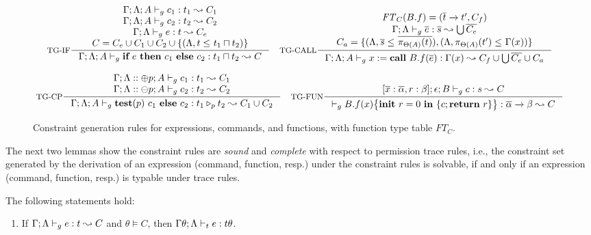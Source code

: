 {{{\begin{figure*}[ht]
\begin{tiny}
\[
\inference[TG-IF]
{
\Gamma;\trace; A \vdash_{g} c_1 : t_1 \leadsto C_1 \\
\Gamma;\trace; A \vdash_{g} c_2 : t_2 \leadsto C_2 \\
\Gamma;\trace \vdash_{g} e : t \leadsto C_e \\
C = C_e\cup C_1\cup C_2 \cup \{(\trace, t \leq_{} t_1\sqcap t_2) \}}
{\Gamma;\trace;  A \vdash_{g} \lcIF{e}{c_1}{c_2} : t_1\sqcap t_2 \leadsto C}
\quad
\inference[TG-CALL]
{
\FT_{C}(B.f) = (\overline{t} \xrightarrow{} t', C_{f})  \\
\Gamma;\trace \vdash_{g} \overline{e} : \overline{s} \leadsto \bigcup \overline{C_{e}} \\
C_{a} = \{(\trace, \overline{s}\leq_{} \overline{\app{t}{\Theta(A)}}), (\trace, \app{t'}{\Theta(A)}\leq_{} \Gamma(x))\} }
{
\Gamma;\trace; A \vdash_{g} \lcCALL{x}{B.f}{\overline{e}} : \Gamma(x)\leadsto C_{f} \cup \bigcup\overline{C_{e}}\cup C_{a}
}
\]

\[
\inference[TG-CP]
{
\Gamma;\trace::\tplus p; A \vdash_{g} c_1 : t_1  \leadsto C_1 \\
 \Gamma;\trace::\tminus p; A \vdash_{g} c_2 : t_2  \leadsto C_2
 }
{\Gamma;\trace; A \vdash_{g} \lcCP{p}{c_1}{c_2} : \omerge{p}{t_1}{t_2} \leadsto C_1\cup C_2}
\quad
\inference[TG-FUN]
{
[\overline{x}: \overline{\alpha},\lpRES:\beta]; \epsilon; B \vdash_{g} c : s  \leadsto C
}
{
\vdash_{g} \lpPROG{B.f}{x}{c}{\lpRES} :  \overline{\alpha}\xrightarrow{} \beta  \leadsto  C
}
\]
\end{tiny}
\caption{Constraint generation rules for expressions, commands, and functions, with function type table $FT_C$.}
\label{fig:constraint-rules}
\end{figure*}



 
The next two lemmas show the constraint rules are \emph{sound} and \emph{complete} with respect to permission trace rules, i.e., the constraint set generated by the derivation of an expression (command, function, resp.) under the constraint rules is solvable, if and only if an expression (command, function, resp.) is typable under trace rules.

\begin{lemma}\label{lem:cgrsound}
The following statements hold:
\begin{enumerate}[label={(\alph*)}]
\item\label{lem:cgrsound-1} If $\Gamma;\Lambda \vdash_{g} e : t\leadsto C$ and $\theta \vDash C$, then $\Gamma\theta;\Lambda \vdash_{t} e : t\theta $.


\end{enumerate}
\end{lemma}}}}
